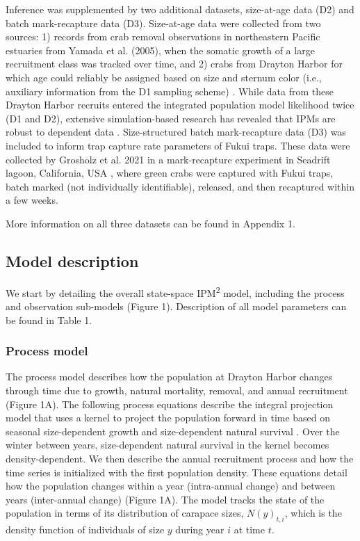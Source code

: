 \documentclass{article}
\begin{document}
Inference was supplemented by two additional datasets, size-at-age data (D2) and batch mark-recapture data (D3). Size-at-age data were collected from two sources: 1) records from crab removal observations in northeastern Pacific estuaries from Yamada et al. (2005), when the somatic growth of a large recruitment class was tracked over time, and 2) crabs from Drayton Harbor for which age could reliably be assigned based on size and sternum color (i.e., auxiliary information from the D1 sampling scheme) \parencite{yamada2005growth}. While data from these Drayton Harbor recruits entered the integrated population model likelihood twice (D1 and D2), extensive simulation-based research has revealed that IPMs are robust to dependent data \parencite{abadi2010assessment}. Size-structured batch mark-recapture data (D3) was included to inform trap capture rate parameters of Fukui traps. These data were collected by Grosholz et al. 2021 in a mark-recapture experiment in Seadrift lagoon, California, USA \parencite{grosholz2021stage}, where green crabs were captured with Fukui traps, batch marked (not individually identifiable), released, and then recaptured within a few weeks. 

More information on all three datasets can be found in Appendix 1. 

\subsection{Model description}

We start by detailing the overall state-space IPM\textsuperscript{2} model, including the process and observation sub-models (Figure 1). Description of all model parameters can be found in Table 1.

\subsubsection{Process model}

The process model describes how the population at Drayton Harbor changes through time due to growth, natural mortality, removal, and annual recruitment (Figure 1A). The following process equations describe the integral projection model that uses a kernel to project the population forward in time based on seasonal size-dependent growth and size-dependent natural survival \parencite{rees2014building}. Over the winter between years, size-dependent natural survival in the kernel becomes density-dependent. We then describe the annual recruitment process and how the time series is initialized with the first population density. These equations detail how the population changes within a year (intra-annual change) and between years (inter-annual change) (Figure 1A). The model tracks the state of the population in terms of its distribution of carapace sizes, $N(y)_{t, i}$, which is the density function of individuals of size $y$ during year $i$ at time $t$. 
\end{document}
